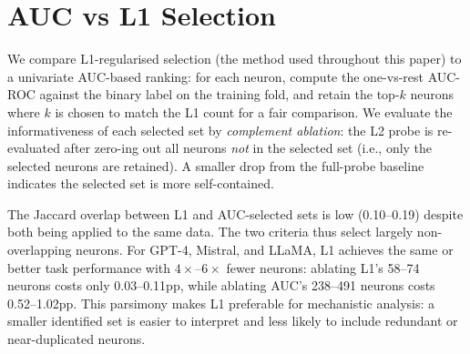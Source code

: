 \documentclass[11pt]{article}
\begin{document}
\section{AUC vs L1 Selection}
\label{app:auc-l1}

We compare L1-regularised selection (the method used throughout this paper) to a univariate AUC-based ranking: for each neuron, compute the one-vs-rest AUC-ROC against the binary label on the training fold, and retain the top-$k$ neurons where $k$ is chosen to match the L1 count for a fair comparison. We evaluate the informativeness of each selected set by \emph{complement ablation}: the L2 probe is re-evaluated after zero-ing out all neurons \emph{not} in the selected set (i.e., only the selected neurons are retained). A smaller drop from the full-probe baseline indicates the selected set is more self-contained.

\begin{table}[!htbp]
\centering
\small
\caption{L1 vs.\ AUC selection: mean across 15 cells. $n$: neurons selected. Jaccard: overlap between the two selection sets. Drop: accuracy drop from baseline when complement is ablated (positive = degradation). Three regimes are visible: parsimony (GPT-4, Mistral, LLaMA: L1 selects far fewer neurons with equivalent or smaller drop), convergence (GPT-2, similar $n$ and similar drop), and reversal (Cohere: AUC selects fewer with smaller drop).}
\label{tab:auc-l1}
\end{table}

The Jaccard overlap between L1 and AUC-selected sets is low (0.10--0.19) despite both being applied to the same data. The two criteria thus select largely non-overlapping neurons. For GPT-4, Mistral, and LLaMA, L1 achieves the same or better task performance with $4\times$--$6\times$ fewer neurons: ablating L1's 58--74 neurons costs only 0.03--0.11pp, while ablating AUC's 238--491 neurons costs 0.52--1.02pp. This parsimony makes L1 preferable for mechanistic analysis: a smaller identified set is easier to interpret and less likely to include redundant or near-duplicated neurons.
\end{document}
